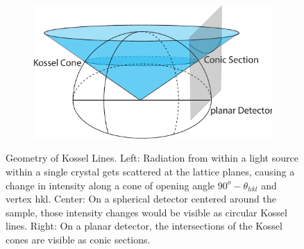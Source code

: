 \begin{figure}
\begin{subfigure}[b]{0.35\textwidth}
	\includegraphics[width=\linewidth]{images/kossel2.pdf}
	\end{subfigure}
	\caption[Geometry of Kossel Lines]{Geometry of Kossel Lines. Left: Radiation from within a light source within a single crystal gets scattered at the lattice planes, causing a change in intensity along a cone of opening angle $90^o-\theta_{hkl}$ and vertex hkl. Center: On a spherical detector centered around the sample, those intensity changes would be visible as circular Kossel lines. Right: On a planar detector, the intersections of the Kossel cones are visible as conic sections.}
	\label{fig:kossel}
\end{figure}
